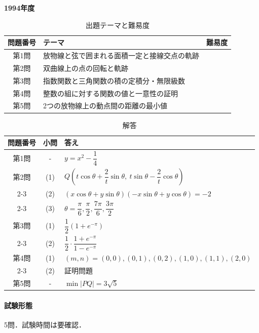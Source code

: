 \documentclass[../../main.tex]{subfiles}
\begin{document}
\begin{center}
  {\fontsize{48pt}{58pt}\selectfont \textbf{1994}\normalsize\textbf{年度}}
\end{center}

\begin{table}[htb]
  \centering
  \caption{出題テーマと難易度}
  \begin{tabular}{|c|p{9cm}|c|}
    \hline
    \textbf{問題番号} & \textbf{テーマ} & \textbf{難易度} \\
    \hline
    第1問 & 放物線と弦で囲まれる面積一定と接線交点の軌跡 & \\
    \hline
    第2問 & 双曲線上の点の回転と軌跡 & \\
    \hline
    第3問 & 指数関数と三角関数の積の定積分・無限級数 & \\
    \hline
    第4問 & 整数の組に対する関数の値と一意性の証明 & \\
    \hline
    第5問 & 2つの放物線上の動点間の距離の最小値 & \\
    \hline
  \end{tabular}
\end{table}

\begin{table}[htb]
  \centering
  \caption{解答}
  \renewcommand{\arraystretch}{1.4}
  \begin{tabular}{|c|c|p{9cm}|}
    \hline
    \textbf{問題番号} & \textbf{小問} & \textbf{答え} \\
    \hline
    第1問 & - & $y=x^2-\dfrac{1}{4}$ \\
    \hline
    第2問 & (1) & $Q\left(t\cos\theta+\dfrac{2}{t}\sin\theta,\ t\sin\theta-\dfrac{2}{t}\cos\theta\right)$ \\
    \cline{2-3}
    & (2) & $(x\cos\theta+y\sin\theta)(-x\sin\theta+y\cos\theta)=-2$ \\
    \cline{2-3}
    & (3) & $\theta=\dfrac{\pi}{6},\dfrac{\pi}{2},\dfrac{7\pi}{6},\dfrac{3\pi}{2}$ \\
    \hline
    第3問 & (1) & $\dfrac{1}{2}(1+e^{-\pi})$ \\
    \cline{2-3}
    & (2) & $\dfrac{1}{2}\cdot\dfrac{1+e^{-\pi}}{1-e^{-\pi}}$ \\
    \hline
    第4問 & (1) & $(m,n)=(0,0),(0,1),(0,2),(1,0),(1,1),(2,0)$ \\
    \cline{2-3}
    & (2) & 証明問題 \\
    \hline
    第5問 & - & $\min|PQ|=3\sqrt{5}$ \\
    \hline
  \end{tabular}
\end{table}

\paragraph{試験形態}
5問．試験時間は要確認．
\end{document}
